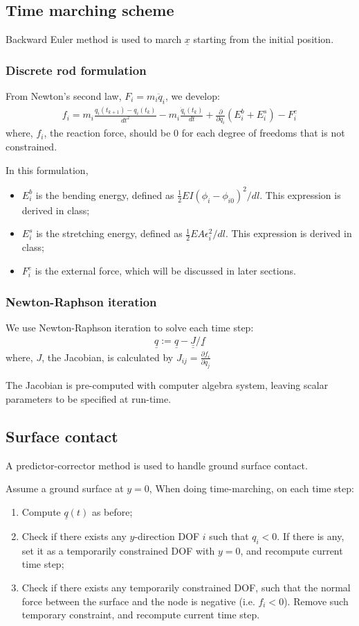 \documentclass[letterpaper,9pt]{article}
\begin{document}
\begin{multicols}{2}
		\subsection{Time marching scheme}
			Backward Euler method is used to march $\underline x$ starting from the initial position.
			\subsubsection{Discrete rod formulation}
				From Newton's second law, $ F_i = m_i\ddot q_i$, we develop:
				\begin{align}
					f_i = m_i\frac{q_i(t_{k+1}) - q_i(t_k)}{dt^2} - m_i\frac{\dot q_i(t_k)}{dt} + \frac{\partial}{\partial q_i}(E_i^b + E_i^s) - F_i^e
				\end{align}
				where, $f_i$, the reaction force, should be $0$ for each degree of freedoms that is not constrained.
				
				In this formulation,
				\begin{itemize}
					\item $E_i^b$ is the bending energy, defined as $\frac12 EI(\phi_i - \phi_{i0})^2 / dl$. This expression is derived in class;
					\item $E_i^s$ is the stretching energy, defined as $\frac12 EA \epsilon_i^2 / dl$. This expression is derived in class;
					\item $F_i^e$ is the external force, which will be discussed in later sections.
				\end{itemize}
			\subsubsection{Newton-Raphson iteration}
				We use Newton-Raphson iteration to solve each time step:
				\begin{align}
					\underline q := \underline q - \underline{\underline J} / \underline{f}
				\end{align}
				where, $J$, the Jacobian, is calculated by $J_{ij} = \frac{\partial f_i}{\partial q_j}$
				
				The Jacobian is pre-computed with computer algebra system, leaving scalar parameters to be specified at run-time.
		\subsection{Surface contact}
			A predictor-corrector method is used to handle ground surface contact.
			
			Assume a ground surface at $y = 0$, When doing time-marching, on each time step:
			\begin{enumerate}
				\item Compute $\underline q(t)$ as before;
				\item Check if there exists any $y$-direction DOF $i$ such that $q_i < 0$. If there is any, set it as a temporarily constrained DOF with $y = 0$, and recompute current time step;
				\item Check if there exists any temporarily constrained DOF, such that the normal force between the surface and the node is negative (i.e. $f_i < 0$). Remove such temporary constraint, and recompute current time step.
			\end{enumerate}

\end{multicols}
\end{document}
